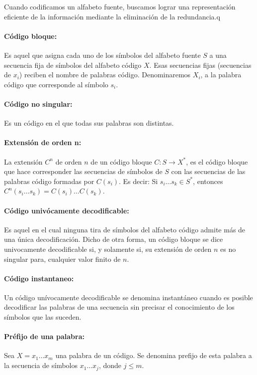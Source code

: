 Cuando codificamos un alfabeto fuente, buscamos lograr una representación eficiente de la información mediante la eliminación de la redundancia.q

\paragraph{Código bloque:} Es aquel que asigna cada uno de los símbolos del alfabeto fuente \(S\) a una secuencia fija de símbolos del alfabeto código \(X\). Esas secuencias fijas (secuencias de \(x_i\)) reciben el nombre de palabras
código. Denominaremos \(X_i\), a la palabra código que corresponde al símbolo \(s_i\).

\paragraph{Código no singular:} Es un código en el que todas sus palabras son distintas.

\paragraph{Extensión de orden n:} La extensión \(C^n\) de orden \(n\) de un código bloque \(C:S\to X^*\), es el código bloque que hace corresponder las secuencias de símbolos de \(S\) con las secuencias de las palabras código formadas por \(C(s_i)\). Es decir: Si \(s_i\dots s_k\in S^*\), entonces \(C^n(s_i\dots s_k) = C(s_i)\dots C(s_k)\).

\paragraph{Código univócamente decodificable:} Es aquel en el cual ninguna tira de símbolos del alfabeto código admite más de una única decodificación. Dicho de otra forma, un código bloque se dice univocamente decodificable si, y solamente si, su extensión de orden \(n\) es no singular para, cualquier valor finito de \(n\).

\paragraph{Código instantaneo:} Un código unívocamente decodificable se denomina instantáneo cuando es posible decodificar las palabras de una secuencia sin precisar el conocimiento de los símbolos que las suceden.

\paragraph{Préfijo de una palabra:} Sea \(X=x_1\dots x_m\) una palabra de un código. Se denomina prefijo de esta palabra a la secuencia de símbolos \(x_1\dots x_j\), donde \(j \leq m\).

